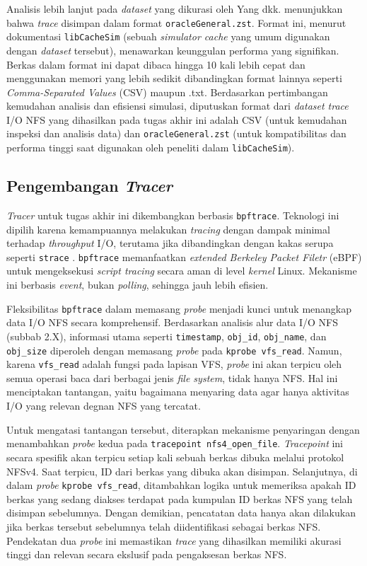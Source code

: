 Analisis lebih lanjut pada \textit{dataset} yang dikurasi oleh Yang dkk. menunjukkan bahwa \textit{trace} disimpan dalam format \texttt{oracleGeneral.zst}. Format ini, menurut dokumentasi \texttt{libCacheSim} (sebuah \textit{simulator cache} yang umum digunakan dengan \textit{dataset} tersebut), menawarkan keunggulan performa yang signifikan. Berkas dalam format ini dapat dibaca hingga 10 kali lebih cepat dan menggunakan memori yang lebih sedikit dibandingkan format lainnya seperti \textit{Comma-Separated Values} (CSV) maupun .txt. Berdasarkan pertimbangan kemudahan analisis dan efisiensi simulasi, diputuskan format dari \textit{dataset trace} I/O NFS yang dihasilkan pada tugas akhir ini adalah CSV (untuk kemudahan inspeksi dan analisis data) dan \texttt{oracleGeneral.zst} (untuk kompatibilitas dan performa tinggi saat digunakan oleh peneliti dalam \texttt{libCacheSim}).

\subsection{Pengembangan \textit{Tracer}}
\textit{Tracer} untuk tugas akhir ini dikembangkan berbasis \texttt{bpftrace}. Teknologi ini dipilih karena kemampuannya melakukan \textit{tracing} dengan dampak minimal terhadap \textit{throughput} I/O, terutama jika dibandingkan dengan kakas serupa seperti \texttt{strace} \parencite{TracerFile}. \texttt{bpftrace} memanfaatkan \textit{extended Berkeley Packet Filetr} (eBPF) untuk mengeksekusi \textit{script tracing} secara aman di level \textit{kernel} Linux. Mekanisme ini berbasis \textit{event}, bukan \textit{polling}, sehingga jauh lebih efisien.

Fleksibilitas \texttt{bpftrace} dalam memasang \textit{probe} menjadi kunci untuk menangkap data I/O NFS secara komprehensif. Berdasarkan analisis alur data I/O NFS (subbab 2.X), informasi utama seperti \texttt{timestamp}, \texttt{obj\_id}, \texttt{obj\_name}, dan \texttt{obj\_size} diperoleh dengan memasang \textit{probe} pada \texttt{kprobe vfs\_read}. Namun, karena \texttt{vfs\_read} adalah fungsi pada lapisan VFS, \textit{probe} ini akan terpicu oleh semua operasi baca dari berbagai jenis \textit{file system}, tidak hanya NFS. Hal ini menciptakan tantangan, yaitu bagaimana menyaring data agar hanya aktivitas I/O yang relevan degnan NFS yang tercatat.

Untuk mengatasi tantangan tersebut, diterapkan mekanisme penyaringan dengan menambahkan \textit{probe} kedua pada \texttt{tracepoint nfs4\_open\_file}. \textit{Tracepoint} ini secara spesifik akan terpicu setiap kali sebuah berkas dibuka melalui protokol NFSv4. Saat terpicu, ID dari berkas yang dibuka akan disimpan. Selanjutnya, di dalam \textit{probe} \texttt{kprobe vfs\_read}, ditambahkan logika untuk memeriksa apakah ID berkas yang sedang diakses terdapat pada kumpulan ID berkas NFS yang telah disimpan sebelumnya. Dengan demikian, pencatatan data hanya akan dilakukan jika berkas tersebut sebelumnya telah diidentifikasi sebagai berkas NFS. Pendekatan dua \textit{probe} ini memastikan \textit{trace} yang dihasilkan memiliki akurasi tinggi dan relevan secara ekslusif pada pengaksesan berkas NFS.

